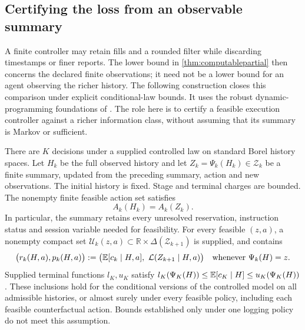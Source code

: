 \subsection{Certifying the loss from an observable summary}
\label{sec:summarycertificate}

A finite controller may retain fills and a rounded filter while discarding
timestamps or finer reports. The lower bound in \cref{thm:computablepartial}
then concerns the declared finite observations; it need not be a lower bound
for an agent observing the richer history. The following construction closes
this comparison under explicit conditional-law bounds. It uses the robust
dynamic-programming foundations of \citet{iyengar2005,nilim2005}. The role
here is to certify a feasible execution controller against a richer
information class, without assuming that its summary is Markov or sufficient.

\begin{assumption}
\label{ass:summaryenvelopes}
There are $K$ decisions under a supplied controlled law on standard Borel
history spaces. Let $H_k$ be the full observed history and let
$Z_k=\Psi_k(H_k)\in\mathcal Z_k$ be a finite summary, updated from the
preceding summary, action and new observations. The initial history is fixed.
Stage and terminal charges are bounded. The nonempty finite feasible action
set satisfies
\[
 A_k(H_k)=A_k(Z_k).
\]
In particular, the summary retains every unresolved reservation, instruction
status and session variable needed for feasibility. For every feasible
$(z,a)$, a nonempty compact set
$\mathcal U_k(z,a)\subset\mathbb R\times\Delta(\mathcal Z_{k+1})$
is supplied, and contains
\begin{equation}\label{eq:conditionalenvelope}
 \bigl(r_k(H,a),p_k(H,a)\bigr):=
 \bigl(\mathbb{E}[c_k\mid H,a],\ \mathcal L(Z_{k+1}\mid H,a)\bigr)
 \quad\text{whenever }\Psi_k(H)=z.
\end{equation}
Supplied terminal functions $l_K,u_K$ satisfy
$l_K(\Psi_K(H))\le\mathbb{E}[c_K\mid H]\le u_K(\Psi_K(H))$.
These inclusions hold for the conditional versions of the controlled model
on all admissible histories, or almost surely under every feasible policy,
including each feasible counterfactual action. Bounds established only under
one logging policy do not meet this assumption.
\end{assumption}

